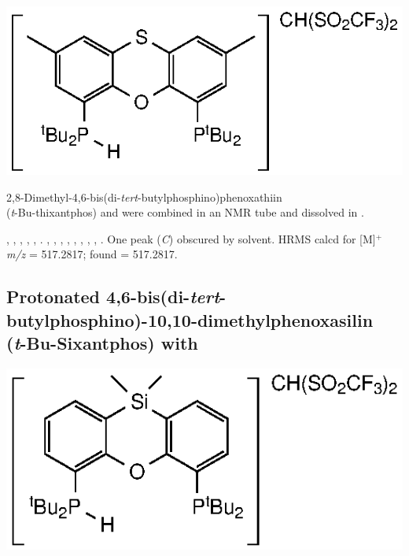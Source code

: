 \begin{structure}[h]
\begin{center}
\includegraphics{../Structures/StBuH.eps}
\end{center}
\end{structure}

2,8-Dimethyl-4,6-bis(di-\emph{tert}-butylphosphino)phenoxathiin \\(\emph{t}-Bu-thixantphos) and  were combined in an NMR tube and dissolved in .  

,
,
,
,
,
.
,
,
,
,
,
,
,
,
.
One peak (\emph{C}) obscured by solvent.
HRMS calcd for  [M]$^+$ \emph{m/z} = 517.2817; found = 517.2817.


\subsection*{Protonated 4,6-bis(di-\emph{tert}-butylphosphino)-10,10-dimethylphenoxasilin\\(\emph{t}-Bu-Sixantphos) with }

\begin{structure}[h]
\begin{center}
\includegraphics{../Structures/SitBuH.eps}
\end{center}
\end{structure}

